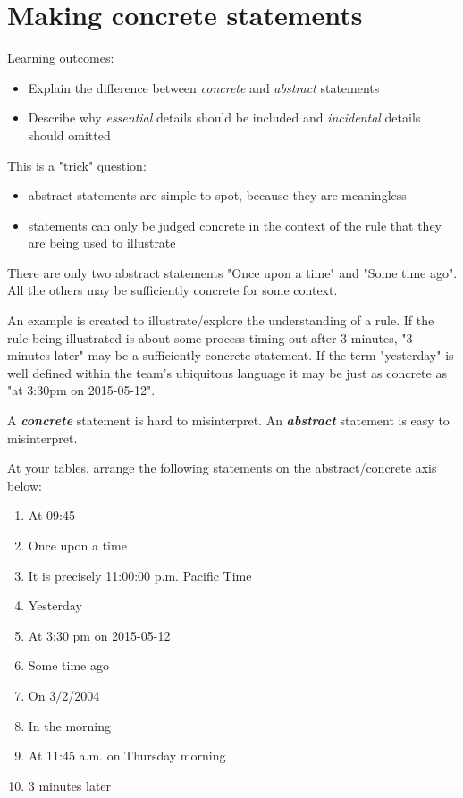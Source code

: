 \chapter*{Making concrete statements}

\ifnotes

    Learning outcomes:
    
    \begin{itemize}
        \item Explain the difference between \emph{concrete} and \emph{abstract} statements
        \item Describe why \emph{essential} details should be included and \emph{incidental} details should omitted 
    \end{itemize}

    This is a "trick" question:
    
    \begin{itemize}
        \item abstract statements are simple to spot, because they are meaningless
        \item statements can only be judged concrete in the context of the rule that they are being used to illustrate
    \end{itemize}
   
    There are only two abstract statements "Once upon a time" and "Some time ago". All the others may be sufficiently concrete for some context.
    
    An example is created to illustrate/explore the understanding of a rule. If the rule being illustrated is about some process timing out after 3 minutes, "3 minutes later" may be a sufficiently concrete statement. If the term "yesterday" is well defined within the team's ubiquitous language it may be just as concrete as "at 3:30pm on 2015-05-12".
\fi 

\ifcontent

    A \textbf{\textit{concrete}} statement is hard to misinterpret.  An \textbf{\textit{abstract}} statement is easy to misinterpret. 
    
    At your tables, arrange the following statements on the abstract/concrete axis below:
    
    \begin{enumerate}
        \item At 09:45
        \item Once upon a time
        \item It is precisely 11:00:00 p.m. Pacific Time
        \item Yesterday
        \item At 3:30 pm on 2015-05-12
        \item Some time ago
        \item On 3/2/2004
        \item In the morning
        \item At 11:45 a.m. on Thursday morning
        \item 3 minutes later
    \end{enumerate}
    
